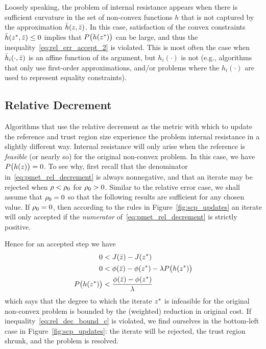 \documentclass[letterpaper, 10 pt, conference]{ieeeconf}
\begin{document}
Loosely speaking, the problem of internal resistance appears when there is sufficient curvature in the set of non-convex functions $h$ that is not captured by the approximation $\bar{h}(z,\bar{z})$. In this case, satisfaction of the convex constraints $\bar{h}(z^*,\bar{z}) \leq 0$ implies that $P\big(h(z^*)\big)$ can be large, and thus the inequality~\eqref{eq:rel_err_accept_2} is violated. This is most often the case when $\bar{h}_i(\cdot,\bar{z})$ is an affine function of its argument, but $h_i(\cdot)$ is not (e.g., algorithms that only use first-order approximations, and/or problems where the $h_i(\cdot)$ are used to represent equality constraints). 

\subsection{Relative Decrement}\label{subsec:crepp_rel_dec}

Algorithms that use the relative decrement as the metric with which to update the reference and trust region size experience the problem internal resistance in a slightly different way. Internal resistance will only arise when the reference is \textit{feasible} (or nearly so) for the original non-convex problem. In this case, we have $P\big(h(z)\big)=0$. To see why, first recall that the denominator in~\eqref{eq:pmet_rel_decrement} is always nonnegative, and that an iterate may be rejected when $\rho<\rho_0$ for $\rho_0>0$. Similar to the relative error case, we shall assume that $\rho_0=0$ so that the following results are sufficient for any chosen value. If $\rho_0=0$, then according to the rules in Figure~\ref{fig:scp_updates} an iterate will only accepted if the \textit{numerator} of~\eqref{eq:pmet_rel_decrement} is strictly positive. 

Hence for an accepted step we have
\begin{subequations}\label{eq:rel_dec_bound}
\begin{align}
0 &< J(\bar{z}) - J(z^*) \label{eq:rel_dec_bound_a}\\
0 &< \phi(\bar{z}) - \phi(z^*) - \lambda P\big( h(z^*) \big) \label{eq:rel_dec_bound_b}\\
P\big( h(z^*) \big) &< \frac{\phi(\bar{z}) - \phi(z^*)}{\lambda} \label{eq:rel_dec_bound_c}
\end{align}
\end{subequations}
which says that the degree to which the iterate $z^*$ is infeasible for the original non-convex problem is bounded by the (weighted) reduction in original cost. If inequality~\eqref{eq:rel_dec_bound_c} is violated, we find ourselves in the bottom-left case in Figure~\ref{fig:scp_updates}: the iterate will be rejected, the trust region shrunk, and the problem is resolved. 
\end{document}
